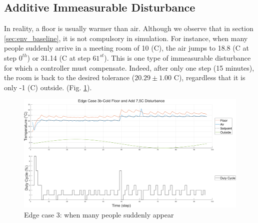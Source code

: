 \documentclass[../main.tex]{subfiles}
\begin{document}
\subsection{Additive Immeasurable Disturbance}
In reality, a floor is usually warmer than air. Although we observe that in section \ref{sec:env_baseline}, it is not compulsory in simulation. For instance, when many people suddenly arrive in a 
meeting room of 10 (\degree C), the air jumps to 18.8 (\degree C at step $0^{th}$) or 31.14 (\degree C at step $61^{st}$). This is one type of immeasurable disturbance for which a controller must compensate. Indeed, after only one step (15 minutes), the room is back to the desired tolerance ($20.29 \pm 1.00$ \degree C), regardless that it is only -1 (\degree C) outside. (Fig. \ref{fig:edge_3}).
\begin{figure}[htbp]
    \centering
    \includegraphics[width=1\linewidth]{figures/EdgeCase3b-ColdFloorandAdd7,5CDisturbance.png}
    \caption{Edge case 3: when many people suddenly appear}
    \label{fig:edge_3}
\end{figure}
\end{document}
